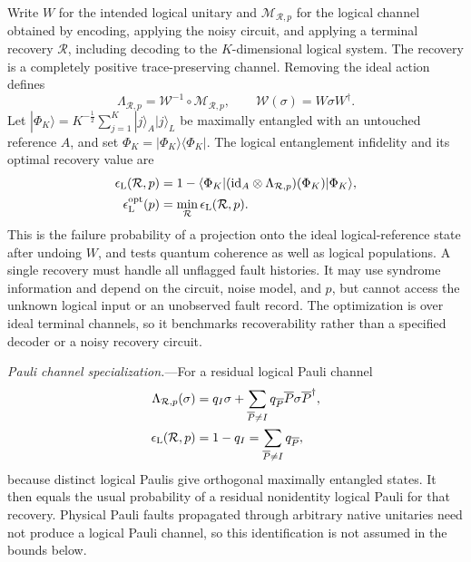 \documentclass[aps,prl,reprint,longbibliography,nofootinbib,nobibnotes]{revtex4-2}
\begin{document}
Write $W$ for the intended logical unitary and $\mathcal M_{\mathcal R,p}$ for the logical channel
obtained by encoding, applying the noisy circuit, and applying a terminal recovery $\mathcal R$,
including decoding to the $K$-dimensional logical system. The recovery is a completely positive
trace-preserving channel. Removing the ideal action defines
\begin{equation}\label{eq:logical-residual-channel}
 \Lambda_{\mathcal R,p}
 =\mathcal W^{-1}\circ\mathcal M_{\mathcal R,p},
 \qquad \mathcal W(\sigma)=W\sigma W^\dagger .
\end{equation}
Let $|\Phi_K\rangle=K^{-\frac{1}{2}}\sum_{j=1}^K|j\rangle_A|j\rangle_L$ be maximally entangled with
an untouched reference $A$, and set $\Phi_K=|\Phi_K\rangle\langle\Phi_K|$. The logical entanglement
infidelity and its optimal recovery value are~\cite{Schumacher}
\begin{equation}\label{eq:logical-entanglement-infidelity}
 \begin{aligned}
 \epsilon_{\rm L}(\mathcal R,p)
 &=1-\langle\Phi_K|
   (\mathrm{id}_A\otimes\Lambda_{\mathcal R,p})(\Phi_K)
   |\Phi_K\rangle,\\
 \epsilon_{\rm L}^{\rm opt}(p)
 &=\min_{\mathcal R}\epsilon_{\rm L}(\mathcal R,p).
 \end{aligned}
\end{equation}
This is the failure probability of a projection onto the ideal logical-reference state after
undoing $W$, and tests quantum coherence as well as logical populations. A single recovery must
handle all unflagged fault histories. It may use syndrome information and depend on the circuit,
noise model, and $p$, but cannot access the unknown logical input or an unobserved fault record.
The optimization is over ideal terminal channels, so it benchmarks recoverability rather than a
specified decoder or a noisy recovery circuit.

\emph{Pauli channel specialization.}---For a residual logical Pauli channel
\begin{equation}\label{eq:logical-pauli-error-rate}
 \begin{aligned}
 \Lambda_{\mathcal R,p}(\sigma)
 &=q_I\sigma+\sum_{\overline P\ne I}
      q_{\overline P}\overline P\sigma\overline P^\dagger,\\
 \epsilon_{\rm L}(\mathcal R,p)
 &=1-q_I=\sum_{\overline P\ne I}q_{\overline P},
 \end{aligned}
\end{equation}
because distinct logical Paulis give orthogonal maximally entangled states. It then equals the
usual probability of a residual nonidentity logical Pauli for that recovery. Physical Pauli faults
propagated through arbitrary native unitaries need not produce a logical Pauli channel, so this
identification is not assumed in the bounds below. 
\end{document}
